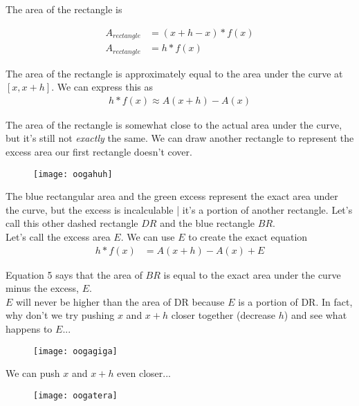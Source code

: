 \documentclass{article}
\begin{document}
\noindent
The area of the rectangle is

\begin{align}
A_{rectangle} &= (x+h - x)*f(x) \\
A_{rectangle} &= h*f(x)
\end{align}

\noindent
The area of the rectangle is approximately equal to the area under the curve at $[x,x+h]$. We can express this as 
\begin{align}
h*f(x) \approx A(x+h)-A(x)
\end{align}

\newpage

\noindent
The area of the rectangle is somewhat close to the actual area under the curve, but it's still not \textit{exactly} the same. We can draw another rectangle to represent the excess area our first rectangle doesn't cover.

\begin{figure}[htbp!]
\centering

\texttt{[image: oogahuh]}
\end{figure}

\noindent
The blue rectangular area and the green excess represent the exact area under the curve, but the excess is incalculable | it's a portion of another rectangle. Let's call this other dashed rectangle $DR$ and the blue rectangle $BR$. \\

\noindent
Let's call the excess area $E$. We can use $E$ to create the exact equation
\begin{align}
h*f(x) &= A(x+h)-A(x)+E
\end{align}

\noindent
Equation 5 says that the area of $BR$ is equal to the exact area under the curve minus the excess, $E$. \\

\noindent
$E$ will never be higher than the area of DR because $E$ is a portion of DR. In fact, why don't we try pushing $x$ and $x+h$ closer together (decrease $h$) and see what happens to $E$...

\begin{figure}[htbp!]
\centering
\texttt{[image: oogagiga]}
\end{figure}

\newpage

\noindent
We can push $x$ and $x+h$ even closer...

\begin{figure}[htbp!]
\centering
\texttt{[image: oogatera]}
\end{figure}
\end{document}
